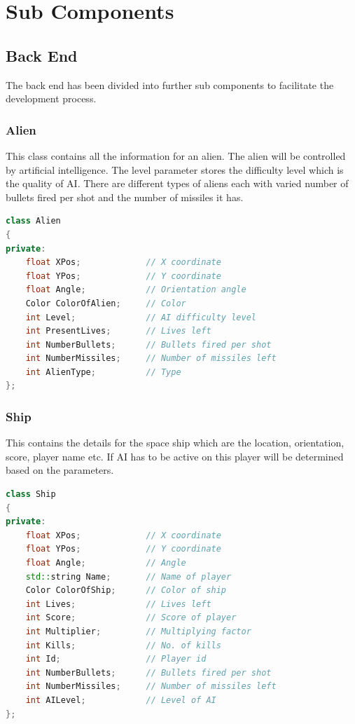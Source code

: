 \documentclass{article}
\begin{document}
	\section{Sub Components}

			\subsection{Back End}
				The back end has been divided into further sub components to facilitate the development process.
				\subsubsection{Alien}
					This class contains all the information for an alien. The alien will be controlled by artificial intelligence. The level parameter stores the difficulty level which is the quality of AI. There are different types of aliens each with varied number of bullets fired per shot and the number of missiles it has.
					\begin{lstlisting}[language=C++, caption={Class Parameters for Alien}]
class Alien
{
private:
	float XPos;				// X coordinate
	float YPos;				// Y coordinate
	float Angle;			// Orientation angle
	Color ColorOfAlien;		// Color
	int Level;				// AI difficulty level
	int PresentLives;		// Lives left
	int NumberBullets;		// Bullets fired per shot
	int NumberMissiles;		// Number of missiles left
	int AlienType;			// Type
};
					\end{lstlisting}
				\subsubsection{Ship}
					This contains the details for the space ship which are the location, orientation, score, player name etc. If AI has to be active on this player will be determined based on the parameters.
					\begin{lstlisting}[language=C++, caption={Class Parameters for Ship}]
class Ship
{
private:
	float XPos;				// X coordinate
	float YPos;				// Y coordinate
	float Angle;			// Angle
	std::string Name;		// Name of player
	Color ColorOfShip;		// Color of ship
	int Lives;				// Lives left
	int Score;				// Score of player
	int Multiplier;			// Multiplying factor
	int Kills;				// No. of kills
	int Id;					// Player id
	int NumberBullets;		// Bullets fired per shot
	int NumberMissiles;		// Number of missiles left
	int AILevel;			// Level of AI
};
					\end{lstlisting}
\end{document}
